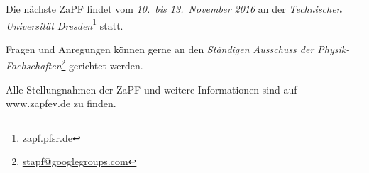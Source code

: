 \vfill

Die nächste ZaPF findet vom \emph{10.\ bis 13.\ November 2016} an der  
\emph{Technischen Universität 
Dresden}\footnote{\href{https://zapf.pfsr.de/}{\url{zapf.pfsr.de}}} statt.

Fragen und Anregungen können gerne an den \emph{Ständigen Ausschuss der Physik-Fachschaften}\footnote{\href{mailto:stapf@googlegroups.com}{\url{stapf@googlegroups.com}}} gerichtet werden.

Alle Stellungnahmen der ZaPF und weitere Informationen sind auf 
\href{http://www.zapfev.de}{\url{www.zapfev.de}} zu finden.\\

